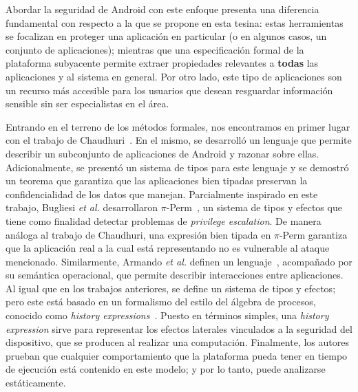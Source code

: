 Abordar la seguridad de Android con este enfoque presenta una diferencia fundamental con respecto a
la que se propone en esta tesina: estas herramientas se focalizan en proteger una aplicación en
particular (o en algunos casos, un conjunto de aplicaciones); mientras que una especificación formal
de la plataforma subyacente permite extraer propiedades relevantes a \textbf{todas} las aplicaciones
y al sistema en general. Por otro lado, este tipo de aplicaciones son un recurso más accesible para
los usuarios que desean resguardar información sensible sin ser especialistas en el área.





Entrando en el terreno de los métodos formales, nos encontramos en primer lugar con el trabajo de
Chaudhuri~\cite{chaudhuri}. En el mismo, se desarrolló un lenguaje que permite describir un
subconjunto de aplicaciones de Android y razonar sobre ellas. Adicionalmente, se presentó un sistema
de tipos para este lenguaje y se demostró un teorema que garantiza que las aplicaciones bien tipadas
preservan la confidencialidad de los datos que manejan. Parcialmente inspirado en este trabajo,
Bugliesi \textit{et al.} desarrollaron $\pi$-Perm~\cite{bugliesi}, un sistema de tipos y efectos que
tiene como finalidad detectar problemas de \textit{privilege escalation}. De manera análoga al
trabajo de Chaudhuri, una expresión bien tipada en $\pi$-Perm garantiza que la aplicación real a la
cual está representando no es vulnerable al ataque mencionado. Similarmente, Armando \textit{et
    al.} definen un lenguaje~\cite{armando}, acompañado por su semántica operacional, que permite
describir interacciones entre aplicaciones. Al igual que en los trabajos anteriores, se define un
sistema de tipos y efectos; pero este está basado en un formalismo del estilo del álgebra de
procesos, conocido como \textit{history expressions}~\cite{history-expressions}. Puesto en términos
simples, una \textit{history expression} sirve para representar los efectos laterales vinculados a
la seguridad del dispositivo, que se producen al realizar una computación. Finalmente, los autores
prueban que cualquier comportamiento que la plataforma pueda tener en tiempo de ejecución está
contenido en este modelo; y por lo tanto, puede analizarse estáticamente.

